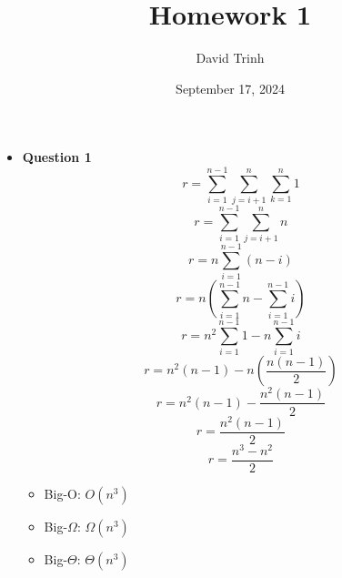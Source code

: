 \documentclass{article}
\title{Homework 1}
\author{David Trinh}
\date{September 17, 2024}
\begin{document}
\maketitle

\begin{itemize}
    \item\textbf{ Question 1}
        \begin{equation}
            r=\sum^{n-1}_{i=1} \sum^{n}_{j=i+1} \sum^{n}_{k=1} 1
        \end{equation}
        \begin{equation}
            r=\sum^{n-1}_{i=1} \sum^{n}_{j=i+1} n
        \end{equation}
        \begin{equation}
            r=n\sum^{n-1}_{i=1} (n-i)
        \end{equation}
        \begin{equation}
            r=n\left(\sum^{n-1}_{i=1} n - \sum^{n-1}_{i=1} i \right)
        \end{equation}
        \begin{equation}
            r=n^2\sum^{n-1}_{i=1} 1 - n\sum^{n-1}_{i=1} i
        \end{equation}
        \begin{equation}
            r=n^2(n-1) - n\left(\frac{n(n-1)}{2}\right)
        \end{equation}
        \begin{equation}
            r=n^2(n-1) - \frac{n^2(n-1)}{2}
        \end{equation}
        \begin{equation}
            r=\frac{n^2(n-1)}{2}
        \end{equation}
        \begin{equation}
            r=\frac{n^3-n^2}{2}
        \end{equation}
        \begin{itemize}
            \item[] Big-O: $O(n^3)$
            \item[] Big-$\Omega$: $\Omega(n^3)$
            \item[] Big-$\Theta$: $\Theta(n^3)$
        \end{itemize}


\end{itemize}
\end{document}
